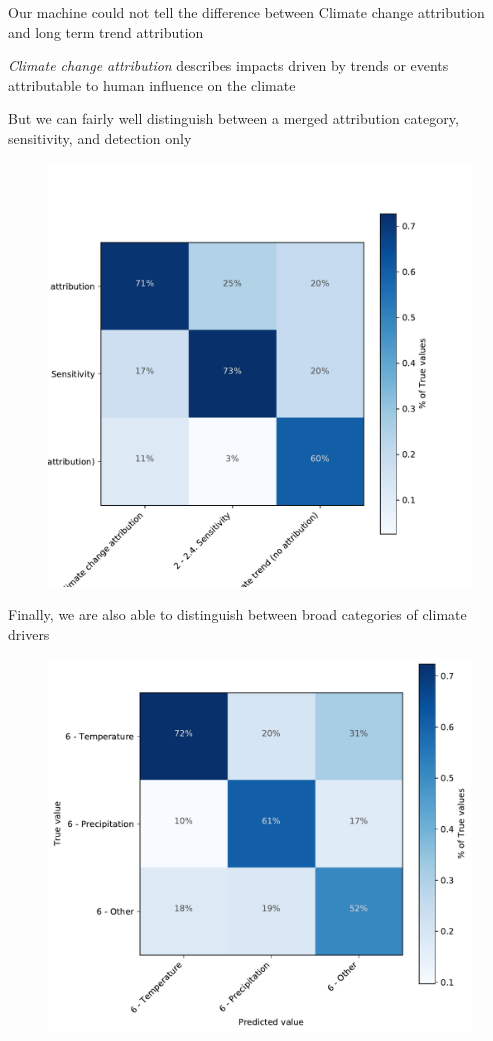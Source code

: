 \documentclass[9pt]{beamer}
\begin{document}
\begin{frame}{Our machine could not tell the difference between Climate change attribution and long term trend attribution}

\textit{Climate change attribution} describes impacts driven by trends or events attributable to human influence on the climate

\medskip

But we can fairly well distinguish between a merged attribution category, sensitivity, and detection only

\begin{figure}
	\includegraphics[width=0.6\linewidth]{../plots/prediction_models/attribution_category_confusion_recall.pdf}
\end{figure}
\end{frame}

\begin{frame}{Finally, we are also able to distinguish between broad categories of climate drivers}

\begin{figure}
	\includegraphics[width=0.6\linewidth]{../plots/prediction_models/driver_category_confusion_recall.pdf}
\end{figure}
\end{frame}
\end{document}
